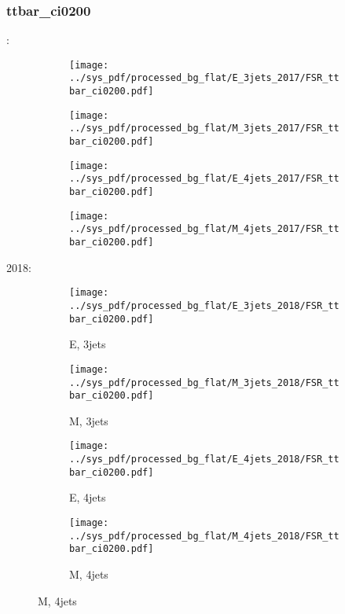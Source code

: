 \documentclass{beamer}
\begin{document}
\begin{frame}
\frametitle{ttbar_ci0200}
\fontsize{5}{1}:
\begin{figure}
\centering
\begin{subfigure}[b]{0.24\textwidth}
\texttt{[image: ../sys\_pdf/processed\_bg\_flat/E\_3jets\_2017/FSR\_ttbar\_ci0200.pdf]}
\end{subfigure}
\begin{subfigure}[b]{0.24\textwidth}
\texttt{[image: ../sys\_pdf/processed\_bg\_flat/M\_3jets\_2017/FSR\_ttbar\_ci0200.pdf]}
\end{subfigure}
\begin{subfigure}[b]{0.24\textwidth}
\texttt{[image: ../sys\_pdf/processed\_bg\_flat/E\_4jets\_2017/FSR\_ttbar\_ci0200.pdf]}
\end{subfigure}
\begin{subfigure}[b]{0.24\textwidth}
\texttt{[image: ../sys\_pdf/processed\_bg\_flat/M\_4jets\_2017/FSR\_ttbar\_ci0200.pdf]}
\end{subfigure}
\end{figure}
2018:
\begin{figure}
\centering
\begin{subfigure}[b]{0.24\textwidth}
\texttt{[image: ../sys\_pdf/processed\_bg\_flat/E\_3jets\_2018/FSR\_ttbar\_ci0200.pdf]}
\captionsetup{font=tiny}
\caption{E, 3jets}
\end{subfigure}
\begin{subfigure}[b]{0.24\textwidth}
\texttt{[image: ../sys\_pdf/processed\_bg\_flat/M\_3jets\_2018/FSR\_ttbar\_ci0200.pdf]}
\captionsetup{font=tiny}
\caption{M, 3jets}
\end{subfigure}
\begin{subfigure}[b]{0.24\textwidth}
\texttt{[image: ../sys\_pdf/processed\_bg\_flat/E\_4jets\_2018/FSR\_ttbar\_ci0200.pdf]}
\captionsetup{font=tiny}
\caption{E, 4jets}
\end{subfigure}
\begin{subfigure}[b]{0.24\textwidth}
\texttt{[image: ../sys\_pdf/processed\_bg\_flat/M\_4jets\_2018/FSR\_ttbar\_ci0200.pdf]}
\captionsetup{font=tiny}
\caption{M, 4jets}
\end{subfigure}
\end{figure}
\end{frame}
\end{document}
